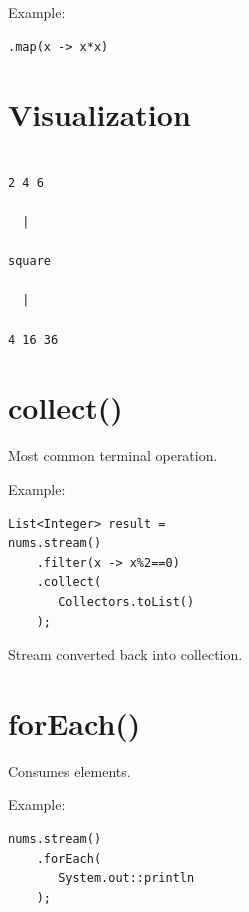 \documentclass[11pt,a4paper]{book}
\begin{document}

Example:

\begin{verbatim} 
.map(x -> x*x)
\end{verbatim}


\section{Visualization}

\begin{verbatim}

2 4 6

  |

square

  |

4 16 36

\end{verbatim}


\section{collect()}

Most common terminal operation.


Example:

\begin{verbatim} 
List<Integer> result =
nums.stream()
    .filter(x -> x%2==0)
    .collect(
       Collectors.toList()
    );
\end{verbatim}


Stream converted back into
collection.


\section{forEach()}

Consumes elements.


Example:

\begin{verbatim} 
nums.stream()
    .forEach(
       System.out::println
    );
\end{verbatim}
\end{document}
